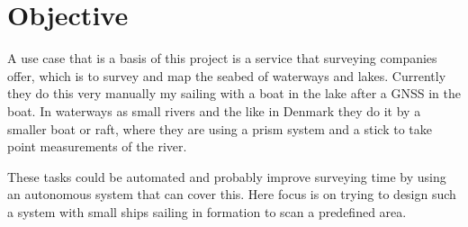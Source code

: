 \section{Objective}


A use case that is a basis of this project is a service that surveying
companies offer, which is to survey and map the seabed of waterways and
lakes. Currently they do this very manually my sailing with a boat in
the lake after a \ac{GNSS} in the boat. In waterways as small rivers
and the like in Denmark they do it by a smaller boat or raft, where
they are using a prism system and a stick to take point measurements
of the river.

These tasks could be automated and probably improve surveying time by
using an autonomous system that can cover this. Here focus is on
trying to design such a system with small ships sailing in formation
to scan a predefined area.


